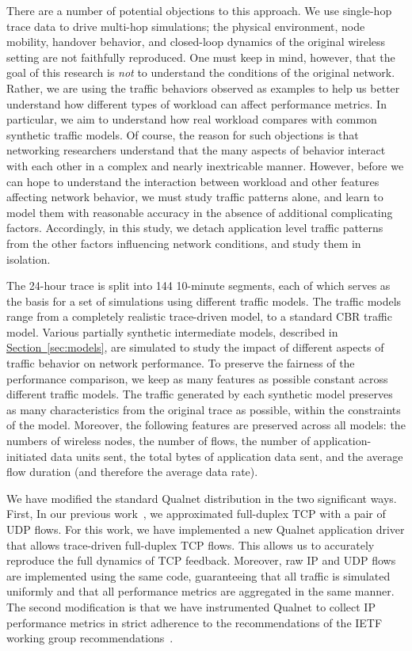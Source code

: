 \documentclass[conference]{IEEEtran}
\newcommand{\caps}[1]{{\small{#1}}}
\newcommand{\Section}[1]{\hyperref[sec:#1]{Section~\ref*{sec:#1}}}
\begin{document}
There are a number of potential objections to this approach. We use single-hop trace data to drive multi-hop simulations; the physical environment, node mobility, handover behavior, and closed-loop dynamics of the original wireless setting are not faithfully reproduced. One must keep in mind, however, that the goal of this research is \textit{not} to understand the conditions of the original network. Rather, we are using the traffic behaviors observed as examples to help us better understand how different types of workload can affect performance metrics. In particular, we aim to understand how real workload compares with common synthetic traffic models. Of course, the reason for such objections is that networking researchers understand that the many aspects of behavior interact with each other in a complex and nearly inextricable manner. However, before we can hope to understand the interaction between workload and other features affecting network behavior, we must study traffic patterns alone, and learn to model them with reasonable accuracy in the absence of additional complicating factors. Accordingly, in this study, we detach application level traffic patterns from the other factors influencing network conditions, and study them in isolation.

The 24-hour trace is split into 144 10-minute segments, each of which serves as the basis for a set of simulations using different traffic models. The traffic models range from a completely realistic trace-driven model, to a standard \caps{CBR} traffic model. Various partially synthetic intermediate models, described in \Section{models}, are simulated to study the impact of different aspects of traffic behavior on network performance. To preserve the fairness of the performance comparison, we keep as many features as possible constant across different traffic models. The traffic generated by each synthetic model preserves as many characteristics from the original trace as possible, within the constraints of the model. Moreover, the following features are preserved across all models: the numbers of wireless nodes, the number of flows, the number of application-initiated data units sent, the total bytes of application data sent, and the average flow duration (and therefore the average data rate).

We have modified the standard Qualnet distribution in the two significant ways. First, In our previous work~\cite{Karpinski07:realism,Karpinski07:cbr-failure}, we approximated full-duplex \caps{TCP} with a pair of \caps{UDP} flows. For this work, we have implemented a new Qualnet application driver that allows trace-driven full-duplex \caps{TCP} flows. This allows us to accurately reproduce the full dynamics of \caps{TCP} feedback. Moreover, raw \caps{IP} and \caps{UDP} flows are implemented using the same code, guaranteeing that all traffic is simulated uniformly and that all performance metrics are aggregated in the same manner. The second modification is that we have instrumented Qualnet to collect \caps{IP} performance metrics in strict adherence to the recommendations of the \caps{IETF} working group recommendations~\cite{rfc:ip-metrics,rfc:jitter}.
\end{document}
